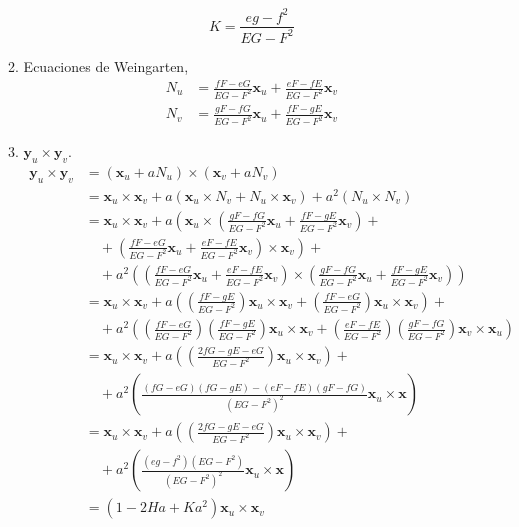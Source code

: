 \begin{problema}
\begin{enumerate}
\begin{sol}
\begin{enumerate}
                $$K = \frac{eg - f^2}{EG - F^2}$$
                \item Ecuaciones de Weingarten, 
                \begin{align*}
                    N_u &= \frac{fF-eG}{EG-F^2}\mathbf{x}_u +\frac{eF-fE}{EG-F^2}  \mathbf{x}_v\\
                    N_v &= \frac{gF-fG}{EG-F^2} \mathbf{x}_u  + \frac{fF-gE}{EG-F^2}\mathbf{x}_v
                \end{align*}
                \item $\mathbf{y}_{u} \times \mathbf{y}_{v}$. 
                \begin{align*}
                    \mathbf{y}_{u} \times \mathbf{y}_{v} &=  (\mathbf{x}_{u} + a N_{u}) \times (\mathbf{x}_{v} + a N_{v})\\
                    &=\mathbf{x}_{u} \times \mathbf{x}_{v} + a(\mathbf{x}_{u} \times N_{v} + N_{u} \times \mathbf{x}_{v}) + a^2 (N_{u} \times N_{v})\\
                    &= \mathbf{x}_{u} \times \mathbf{x}_{v} + a\left(\mathbf{x}_{u} \times \left(\frac{gF-fG}{EG-F^2} \mathbf{x}_u  + \frac{fF-gE}{EG-F^2}\mathbf{x}_v\right)\right. +\\ 
                    &\quad + \left.\left(\frac{fF-eG}{EG-F^2}\mathbf{x}_u +\frac{eF-fE}{EG-F^2}  \mathbf{x}_v\right) \times \mathbf{x}_{v}\right)+\\
                    &\quad + a^2 \left(\left(\frac{fF-eG}{EG-F^2}\mathbf{x}_u +\frac{eF-fE}{EG-F^2}  \mathbf{x}_v\right) \times \left(\frac{gF-fG}{EG-F^2} \mathbf{x}_u  + \frac{fF-gE}{EG-F^2}\mathbf{x}_v\right)\right)\\
                    &= \mathbf{x}_{u} \times \mathbf{x}_{v} + a\left( \left( \frac{fF-gE}{EG-F^2}\right)\mathbf{x}_{u} \times\mathbf{x}_v+\left(\frac{fF-eG}{EG-F^2} \right)\mathbf{x}_u \times \mathbf{x}_{v}\right)+\\
                    &\quad +a^2 \left(\left(\frac{fF-eG}{EG-F^2}\right)\left(\frac{fF-gE}{EG-F^2}\right)\mathbf{x}_u\times \mathbf{x}_v+\left(\frac{eF-fE}{EG-F^2}\right)\left(\frac{gF-fG}{EG-F^2}\right)\mathbf{x}_v\times \mathbf{x}_u\right)\\
                    &= \mathbf{x}_{u} \times \mathbf{x}_{v} + a\left( \left( \frac{2fG-gE-eG}{EG-F^2}\right)\mathbf{x}_{u} \times\mathbf{x}_v\right)+\\
                    &\quad + a^2\left(\frac{(fG-eG)(fG-gE)-(eF-fE)(gF-fG)}{(EG-F^2)^2}\mathbf{x}_{u} \times\mathbf{x}\right)\\
                    &= \mathbf{x}_{u} \times \mathbf{x}_{v} + a\left( \left( \frac{2fG-gE-eG}{EG-F^2}\right)\mathbf{x}_{u} \times\mathbf{x}_v\right)+\\
                    &\quad + a^2\left(\frac{(eg-f^2)(EG-F^2)}{(EG-F^2)^2}\mathbf{x}_{u} \times\mathbf{x}\right)\\
                    &= \left(1-2 H a+K a^{2}\right) \mathbf{x}_{u} \times \mathbf{x}_{v}
                \end{align*}
            \end{enumerate}


\end{sol}
\end{enumerate}
\end{problema}

